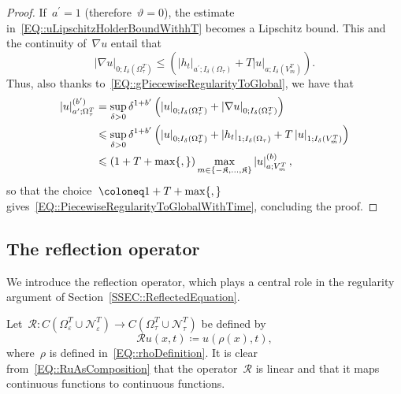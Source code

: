 \documentclass[12pt,a4paper]{amsart}
\makeatletter
\numberwithin{equation}{section}
\theoremstyle{definition}
\theoremstyle{remark}
\newcommand{\eps}{\varepsilon}
\newcommand{\abs}[1]{\left\lvert#1\right\rvert}
\renewcommand{\leq}{\leqslant}
\newcommand{\const}[1]{%
  \csname const@#1\endcsname%
}
\makeatother
\begin{document}
\begin{proof}
    If~$a^\prime = 1$ (therefore~$\vartheta = 0$), the estimate in~\eqref{EQ::uLipschitzHolderBoundWithhT} becomes a Lipschitz bound. This and the continuity of~$\nabla u$ entail that
    \begin{equation}
        \abs{\nabla u}_{0; I_\delta(\Omega_\tau^T)} \leq \left(\abs{h_t}_{a^\prime; I_\delta(\Omega_\tau)} + T\abs{u}_{a;I_\delta(V_m^T)}\right).
    \end{equation}
    Thus, also thanks to~\eqref{EQ::gPiecewiseRegularityToGlobal}, we have that
    \begin{equation}
        \begin{split}
            \abs{u}_{a^\prime; \Omega_\tau^T}^{(b^\prime)} &= \sup_{\delta > 0} \delta^{1 + b^\prime} \left(\abs{u}_{0; I_\delta(\Omega_\tau^T)} + \abs{\nabla u}_{0; I_\delta(\Omega_\tau^T)}\right)\\
                &\leq \sup_{\delta > 0} \delta^{1 + b^\prime} \left(\abs{u}_{0; I_\delta(\Omega_\tau^T)} + \abs{h_t}_{1; I_\delta(\Omega_\tau)} + T\abs{u}_{1;I_\delta(V_m^T)}\right)\\
                &\leq (1+T+\max\{\const{CONST::PiecewiseRegularityToGlobal},\const{CONST::PiecewiseLipschitzToGlobalLipschitz}\}) \max_{m \in \{-\mathfrak{K},\dots,\mathfrak{K}\}} \abs{u}_{a; V_m^T}^{(b)},
        \end{split}
    \end{equation}
    so that the choice~$\const{CONST::PiecewiseRegularityToGlobalWithTime} \coloneq 1+T+\max\{\const{CONST::PiecewiseRegularityToGlobal},\const{CONST::PiecewiseLipschitzToGlobalLipschitz}\}$ gives~\eqref{EQ::PiecewiseRegularityToGlobalWithTime}, concluding the proof.
\end{proof}

\subsection{The reflection operator}\label{SSEC::ReflectionOperator}
We introduce the reflection operator, which plays a central role in the regularity argument of Section~\ref{SSEC::ReflectedEquation}. 

Let~$\mathcal{R} \colon C(\Omega_\eps^T \cup \mathcal{N}_\eps^T) \to C(\Omega_\tau^T \cup \mathcal{N}_\tau^T)$ be defined by
\begin{equation}\label{EQ::RuAsComposition}
    \mathcal{R}u (x, t) \coloneq u(\rho(x), t),
\end{equation}
where~$\rho$ is defined in~\eqref{EQ::rhoDefinition}. It is clear from~\eqref{EQ::RuAsComposition} that the operator~$\mathcal{R}$ is linear and that it maps continuous functions to continuous functions.
\end{document}
